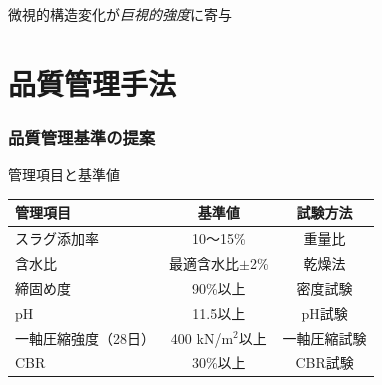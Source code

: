 \documentclass[unicode, 9pt, aspectratio=43]{beamer}
\begin{document}
\begin{refsection}
\begin{frame}
    \vspace{0.5em}
    \centering
    \begin{minipage}{0.6\linewidth}
      \begin{roundbox}[yellow!30]{\linewidth}
        \centering
        \small
        微視的構造変化が\emph{巨視的強度}に寄与
      \end{roundbox}
    \end{minipage}
  \end{frame}

  \section{品質管理手法}

  \begin{frame}
    \frametitle{品質管理基準の提案}
    \begin{center}
      \begin{minipage}{0.85\linewidth}
        \begin{block}{管理項目と基準値}
          \begin{center}
            \small
            \begin{tabular}{lcc}
              \toprule
              \textbf{管理項目} & \textbf{基準値} & \textbf{試験方法} \\
              \midrule
              スラグ添加率 & 10〜15\% & 重量比 \\
              含水比 & 最適含水比\(\pm \)2\% & 乾燥法 \\
              締固め度 & 90\%以上 & 密度試験 \\
              pH & 11.5以上 & pH試験 \\
              一軸圧縮強度（28日） & 400 kN/m\(^2\)以上 & 一軸圧縮試験 \\
              CBR & 30\%以上 & CBR試験 \\
              \bottomrule
            \end{tabular}
          \end{center}
        \end{block}
      \end{minipage}
    \end{center}

    \vspace{0.5em}


\end{frame}
\end{refsection}
\end{document}
